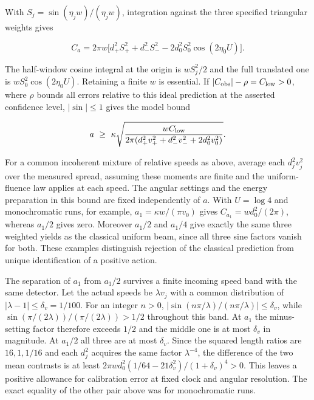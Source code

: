 \documentclass[11pt,a4paper]{article}
\begin{document}
With \(S_j=\sin(\eta_j w)/(\eta_j w)\), integration against the three
specified triangular weights gives

\[
 C_a=2\pi w\big[d_+^2 S_+^2+d_-^2 S_-^2
                 -2d_0^2 S_0^2\cos(2\eta_0 U)\big] .
\]

The half-window cosine integral at the origin is \(w S_j^2/2\) and the
full translated one is \(w S_0^2\cos(2\eta_0 U)\). Retaining a finite
\(w\) is essential. If \(|C_{\rm obs}|-\rho=C_{\rm low}>0\), where
\(\rho\) bounds all errors relative to this ideal prediction at the
asserted confidence level, \(|\sin|\le1\) gives the model bound

\[
 a\ \ge\ \kappa\sqrt{\frac{w C_{\rm low}}
 {2\pi(d_+^2v_+^2+d_-^2v_-^2+2d_0^2v_0^2)}} .
\]

For a common incoherent mixture of relative speeds as above, average
each \(d_j^2v_j^2\) over the measured spread, assuming these moments are
finite and the uniform-fluence law applies at each speed. The angular
settings and the energy preparation in this bound are fixed
independently of \(a\). With \(U=\log4\) and monochromatic runs, for
example, \(a_1=\kappa w/(\pi v_0)\) gives \(C_{a_1}=w d_0^2/(2\pi)\),
whereas \(a_1/2\) gives zero. Moreover \(a_1/2\) and \(a_1/4\) give
exactly the same three weighted yields as the classical uniform beam,
since all three sine factors vanish for both. These examples distinguish
rejection of the classical prediction from unique identification of a
positive action.

The separation of \(a_1\) from \(a_1/2\) survives a finite incoming
speed band with the same detector. Let the actual speeds be
\(\lambda v_j\) with a common distribution of
\(|\lambda-1|\le\delta_v=1/100\). For an integer \(n>0\),
\(|\sin(n\pi/\lambda)/(n\pi/\lambda)|\le\delta_v\), while
\(\sin(\pi/(2\lambda))/(\pi/(2\lambda))>1/2\) throughout this band. At
\(a_1\) the minus-setting factor therefore exceeds \(1/2\) and the
middle one is at most \(\delta_v\) in magnitude. At \(a_1/2\) all three
are at most \(\delta_v\). Since the squared length ratios are
\(16,1,1/16\) and each \(d_j^2\) acquires the same factor
\(\lambda^{-4}\), the difference of the two mean contrasts is at least
\(2\pi w d_0^2(1/64-21\delta_v^2)/(1+\delta_v)^4>0\). This leaves a
positive allowance for calibration error at fixed clock and angular
resolution. The exact equality of the other pair above was for
monochromatic runs.
\end{document}

